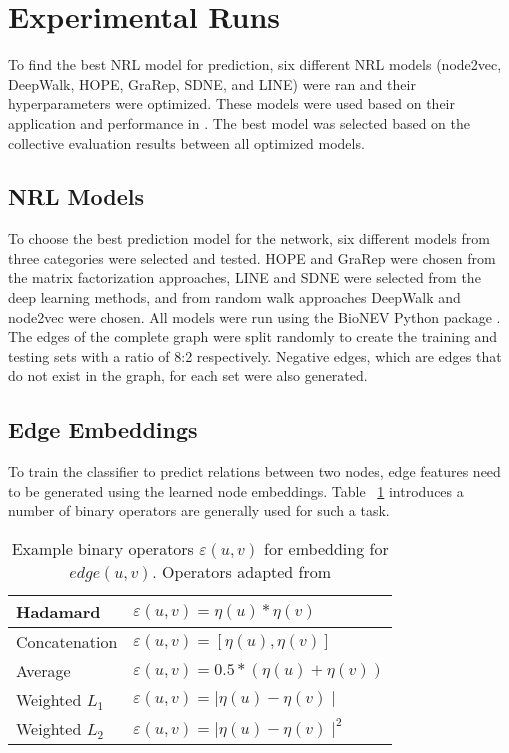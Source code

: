 \section{Experimental Runs}
To find the best \ac{NRL} model for prediction, six different \ac{NRL} models (node2vec, DeepWalk, \ac{HOPE}, \ac{GraRep}, \ac{SDNE}, and \ac{LINE}) were ran and their hyperparameters were optimized. These models were used based on their application and performance in \cite{yue_graph_2019}. The best model was selected based on the collective evaluation results between all optimized models. 

\subsection{NRL Models}
To choose the best prediction model for the network, six different models from three categories were selected and tested. \ac{HOPE} and \ac{GraRep} were chosen from the matrix factorization approaches, \ac{LINE} and \ac{SDNE} were selected from the deep learning methods, and from random walk approaches DeepWalk and node2vec were chosen. All models were run using the BioNEV Python package \cite{yue_graph_2019}. The edges of the complete graph were split randomly to create the training and testing sets with a ratio of 8:2 respectively. Negative edges, which are edges that do not exist in the graph, for each set were also generated.

\subsection{Edge Embeddings}
To train the classifier to predict relations between two nodes, edge features need to be generated using the learned node embeddings. Table ~\ref{tab:operators} introduces a number of binary operators are generally used for such a task. 

\begin{table}[h!]
    \centering
    \begin{tabular}{ |l|l| } 
        \hline
        Hadamard & $\varepsilon(u,v)= \eta(u)*\eta(v)$ \\ 
        \hline
        Concatenation & $\varepsilon(u,v)=[\eta(u), \eta(v)]$ \\ 
        \hline
        Average & $\varepsilon(u,v)=0.5*(\eta(u)+\eta(v))$ \\ 
        \hline
        Weighted $L_{1}$ & $\varepsilon(u,v)=\mid\eta(u)-\eta(v)\mid$ \\
        \hline
        Weighted $L_{2}$ & $\varepsilon(u,v)=\mid\eta(u)-\eta(v)\mid^2$ \\
        \hline
    \end{tabular}
    \caption[Example binary operators $\varepsilon(u,v)$ for embedding for $edge(u,v)$]{Example binary operators $\varepsilon(u,v)$ for embedding for $edge(u,v)$. Operators adapted from \cite{grover_node2vec:_2016}}
    \label{tab:operators}
\end{table}


